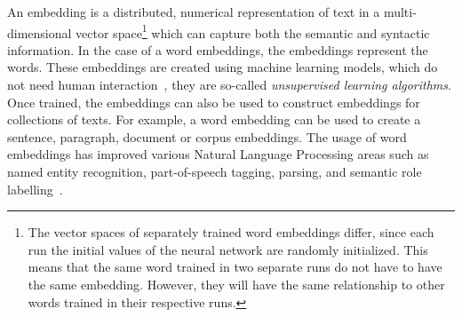 \documentclass[../../Thesis.tex]{subfiles}
\begin{document}
An embedding is a distributed, numerical representation of text in a multi-dimensional vector space\footnote{The vector spaces of separately trained word embeddings differ, since each run the initial values of the neural network are randomly initialized. This means that the same word trained in two separate runs do not have to have the same embedding. However, they will have the same relationship to other words trained in their respective runs.} which can capture both the semantic and syntactic information\cite{mikolov2013distributed}. In the case of a word embeddings, the embeddings represent the words. These embeddings are created using machine learning models, which do not need human interaction~\cite{lai2016generate}, they are so-called \textit{unsupervised learning algorithms}. Once trained, the embeddings can also be used to construct embeddings for collections of texts. For example, a word embedding can be used to create a sentence, paragraph, document or corpus embeddings. The usage of word embeddings has improved various Natural Language Processing areas such as named entity recognition, part-of-speech tagging, parsing, and semantic role labelling~\citet{luong2013better}.
\end{document}
